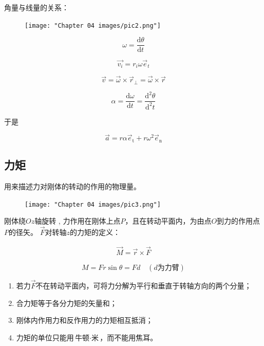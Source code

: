 \documentclass[
	12pt, %
	a4paper, %
]{myLegrandOrangeBook}
\newcommand{\rmd}{\mathrm{d}}
\newcommand{\deriv}[2]{\frac{\rmd #1}{\rmd #2}}
\begin{document}
    角量与线量的关系：

    \begin{figure}
        \centering
        \texttt{[image: "Chapter 04 images/pic2.png"]}
        \label{pic4-2}
    \end{figure}

    \[
        \omega = \deriv{\theta}{t}
    \]

    \[
        \overrightarrow{v_i} = r_i \omega \overrightarrow{e}_t
    \]

    $$
        \overrightarrow{v}=\overrightarrow{\omega} \times \overrightarrow{r}_{\perp}=
        \overrightarrow{\omega} \times \overrightarrow{r}
    $$

    $$
        \alpha=\deriv{\omega}{t}=\frac{\rmd^2 \theta}{\rmd^2 t}
    $$

    于是

    \begin{equation}
        \overrightarrow{a}=r \alpha \overrightarrow{e}_{\mathrm{t}}+r \omega^2 \overrightarrow{e}_{\mathrm{n}}
    \end{equation}

\subsection{力矩}

    \begin{definition}[力矩]
    用来描述力对刚体的转动的作用的物理量。
    \end{definition}

    \begin{figure}
        \centering
        \texttt{[image: "Chapter 04 images/pic3.png"]}
        \label{pic4-3}
    \end{figure}

    刚体绕\(Oz\)轴旋转 , 力作用在刚体上点\(P\)，且在转动平面内，为由点\(O\)到力的作用点\(P\)的径矢。
    \(\overrightarrow{F}\)对转轴\(z\)的力矩的定义：

    \begin{align}
        \overrightarrow{M} = \overrightarrow{r} \times \overrightarrow{F}
    \end{align}

    $$
        M = Fr\sin\theta = Fd \quad (d\text{为力臂})
    $$

    \begin{enumerate}
        \item 若力\(\overrightarrow{F}\)不在转动平面内，可将力分解为平行和垂直于转轴方向的两个分量；
        \item 合力矩等于各分力矩的矢量和；
        \item 刚体内作用力和反作用力的力矩相互抵消；
        \item 力矩的单位只能用\(\text{牛顿} \cdot \text{米}\)，而不能用焦耳。
    \end{enumerate}
\end{document}
